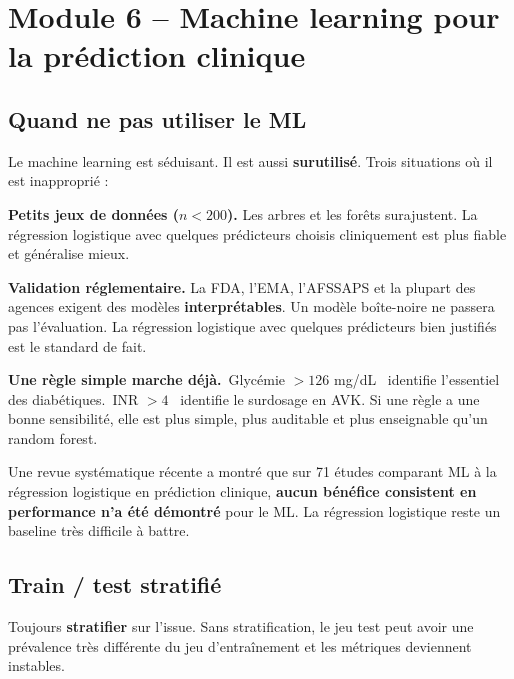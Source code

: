 \documentclass[11pt,a4paper]{article}
\providecommand{\og}{\guillemotleft\,}
\providecommand{\fg}{\,\guillemotright}
\begin{document}
\newpage


\section{Module 6 -- Machine learning pour la pr\'ediction clinique}

\subsection{Quand ne pas utiliser le ML}

Le machine learning est s\'eduisant. Il est aussi \textbf{surutilis\'e}.
Trois situations o\`u il est inappropri\'e :

\textbf{Petits jeux de donn\'ees ($n < 200$).} Les arbres et les for\^ets
surajustent. La r\'egression logistique avec quelques pr\'edicteurs
choisis cliniquement est plus fiable et g\'en\'eralise mieux.

\textbf{Validation r\'eglementaire.} La FDA, l'EMA, l'AFSSAPS et la
plupart des agences exigent des mod\`eles \textbf{interpr\'etables}. Un
mod\`ele bo\^ite-noire ne passera pas l'\'evaluation. La r\'egression
logistique avec quelques pr\'edicteurs bien justifi\'es est le standard
de fait.

\textbf{Une r\`egle simple marche d\'ej\`a.} \og Glyc\'emie $> 126$ mg/dL
\fg{} identifie l'essentiel des diab\'etiques. \og INR $> 4$ \fg{}
identifie le surdosage en AVK. Si une r\`egle a une bonne sensibilit\'e,
elle est plus simple, plus auditable et plus enseignable qu'un random
forest.

\begin{notebox}
Une revue syst\'ematique r\'ecente \citep{christodoulou2019systematic} a
montr\'e que sur 71 \'etudes comparant ML \`a la r\'egression logistique
en pr\'ediction clinique, \textbf{aucun b\'en\'efice consistent en
performance n'a \'et\'e d\'emontr\'e} pour le ML. La r\'egression
logistique reste un baseline tr\`es difficile \`a battre.
\end{notebox}

\subsection{Train / test stratifi\'e}

Toujours \textbf{stratifier} sur l'issue. Sans stratification, le jeu
test peut avoir une pr\'evalence tr\`es diff\'erente du jeu
d'entra\^inement et les m\'etriques deviennent instables.
\end{document}
